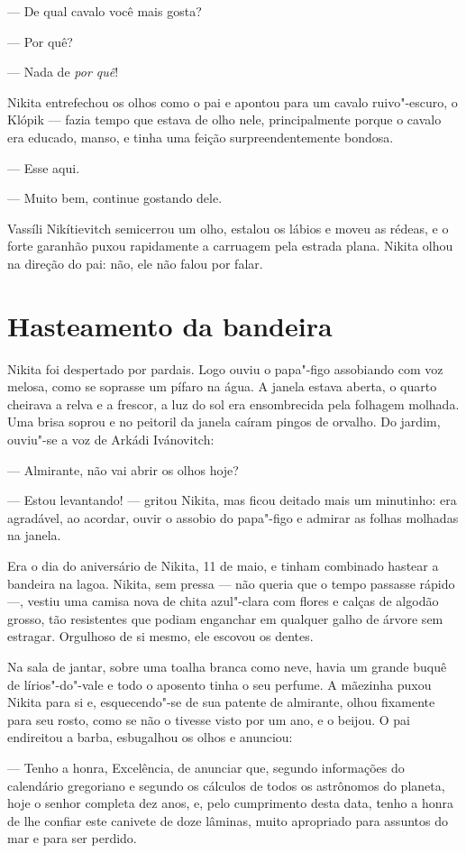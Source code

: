 --- De qual cavalo você mais gosta?

--- Por quê?

--- Nada de \emph{por quê}!

Nikita entrefechou os olhos como o pai e apontou para um cavalo
ruivo"-escuro, o Klópik --- fazia tempo que estava de olho nele,
principalmente porque o cavalo era educado, manso, e tinha uma feição
surpreendentemente bondosa.

--- Esse aqui.

--- Muito bem, continue gostando dele.

Vassíli Nikítievitch semicerrou um olho, estalou os lábios e moveu as
rédeas, e o forte garanhão puxou rapidamente a carruagem pela estrada
plana. Nikita olhou na direção do pai: não, ele não falou por falar.

\chapter{Hasteamento da bandeira}

Nikita foi despertado por pardais. Logo ouviu o papa"-figo assobiando com
voz melosa, como se soprasse um pífaro na água. A janela estava aberta,
o quarto cheirava a relva e a frescor, a luz do sol era ensombrecida
pela folhagem molhada. Uma brisa soprou e no peitoril da janela caíram
pingos de orvalho. Do jardim, ouviu"-se a voz de Arkádi Ivánovitch:

--- Almirante, não vai abrir os olhos hoje?

--- Estou levantando! --- gritou Nikita, mas ficou deitado mais um
minutinho: era agradável, ao acordar, ouvir o assobio do papa"-figo e
admirar as folhas molhadas na janela.

Era o dia do aniversário de Nikita, 11 de maio, e tinham combinado
hastear a bandeira na lagoa. Nikita, sem pressa --- não queria que o
tempo passasse rápido ---, vestiu uma camisa nova de chita azul"-clara
com flores e calças de algodão grosso, tão resistentes que podiam
enganchar em qualquer galho de árvore sem estragar. Orgulhoso de si
mesmo, ele escovou os dentes.

Na sala de jantar, sobre uma toalha branca como neve, havia um grande
buquê de lírios"-do"-vale e todo o aposento tinha o seu perfume. A
mãezinha puxou Nikita para si e, esquecendo"-se de sua patente de
almirante, olhou fixamente para seu rosto, como se não o tivesse visto
por um ano, e o beijou. O pai endireitou a barba, esbugalhou os olhos e
anunciou:

--- Tenho a honra, Excelência, de anunciar que, segundo informações do
calendário gregoriano e segundo os cálculos de todos os astrônomos do
planeta, hoje o senhor completa dez anos, e, pelo cumprimento desta
data, tenho a honra de lhe confiar este canivete de doze lâminas, muito
apropriado para assuntos do mar e para ser perdido.

